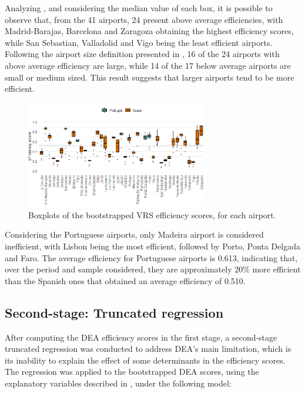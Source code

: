 Analyzing , and considering the median value of each box, it is possible to observe
that, from the 41 airports, 24 present above average efficiencies, with Madrid-Barajas, Barcelona and
Zaragoza obtaining the highest efficiency scores, while San Sebastian, Valladolid and Vigo being the
least efficient airports. Following the airport size definition presented in , 16 of the 24 airports
with above average efficiency are large, while 14 of the 17 below average airports are small or medium
sized. This result suggests that larger airports tend to be more efficient. 

  \vspace{-0.4cm}

\begin{figure}[h!]
  \centering
  \includegraphics[width=8cm]{images/Rplot01.png}
  \vspace{-0.8cm}
  \caption{Boxplots of the bootstrapped VRS efficiency scores, for each airport.}
  \label{fig:boxplot}
\end{figure}

\vspace{-0.3cm}

Considering the Portuguese airports, only Madeira airport is considered inefficient, with Lisbon being
the most efficient, followed by Porto, Ponta Delgada and Faro. The average efficiency for Portuguese
airports is 0.613, indicating that, over the period and sample considered, they are approximately 20\%
more efficient than the Spanish ones that obtained an average efficiency of 0.510.




\vspace{-0.1cm}
\subsection{Second-stage: Truncated regression }
\label{subsec:resul_trunc}

After computing the DEA efficiency scores in the first stage, a second-stage truncated regression
was conducted to address DEA’s main limitation, which is its inability to explain the effect of some
determinants in the efficiency scores. The regression was applied to the bootstrapped DEA scores, using the explanatory variables described in , under the following model:

